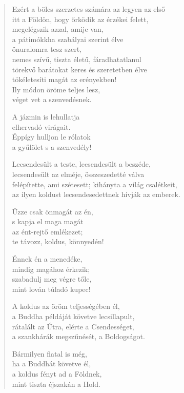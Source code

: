 \begin{verse}
 Ezért a bölcs szerzetes számára az legyen az első\\
itt a Földön, hogy őrködik az érzékei felett,\\
megelégszik azzal, amije van,\\
a pátimókkha szabályai szerint élve\\
önuralomra tesz szert,\\
nemes szívű, tiszta életű, fáradhatatlanul\\
törekvő barátokat keres és szeretetben élve\\
tökéletesíti magát az erényekben!\\
Ily módon öröme teljes lesz,\\
véget vet a szenvedésnek.

 A jázmin is lehullatja\\
elhervadó virágait.\\
Éppígy hulljon le rólatok\\
a gyűlölet s a szenvedély!

 Lecsendesült a teste, lecsendesült a beszéde,\\
lecsendesült az elméje, összeszedetté válva\\
felépítette, ami szétesett; kihányta a világ csalétkeit,\\
az ilyen koldust lecsendesedettnek hívják az emberek.

 Űzze csak önmagát az én,\\
s kapja el maga magát\\
az ént-rejtő emlékezet;\\
te távozz, koldus, könnyedén!

 Énnek én a menedéke,\\
mindig magához érkezik;\\
szabadulj meg végre tőle,\\
mint lován túladó kupec!

 A koldus az öröm teljességében él,\\
a Buddha példáját követve lecsillapult,\\
rátalált az Útra, elérte a Csendességet,\\
a szankhárák megszűnését, a Boldogságot.

 Bármilyen fiatal is még,\\
ha a Buddhát követve él,\\
a koldus fényt ad a Földnek,\\
mint tiszta éjszakán a Hold.

\end{verse}
